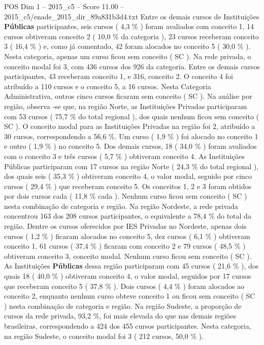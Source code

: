 \begin{textsample}{POS Dim 1 – 2015\_c5 – Score 11.00 – 2015\_c5/enade\_2015\_dir\_89a831b3d4.txt}
Entre os demais cursos de Instituições \textbf{Públicas} participantes, seis cursos ( 4,3 \% ) foram avaliados com conceito 1, 14 cursos obtiveram conceito 2 ( 10,0 \% da categoria ), 23 cursos receberam conceito 3 ( 16,4 \% ) e, como já comentado, 42 foram alocados no conceito 5 ( 30,0 \% ).
Nesta categoria, apenas um curso ficou sem conceito ( SC ).
Na rede privada, o conceito modal foi 3, com 436 cursos dos 926 da categoria.
Entre os demais cursos participantes, 43 receberam conceito 1, e 316, conceito 2.
O conceito 4 foi atribuído a 110 cursos e o conceito 5, a 16 cursos.
Nesta Categoria Administrativa, outros cinco cursos ficaram sem conceito ( SC ).
Na análise por região, observa -se que, na região Norte, as Instituições Privadas participaram com 53 cursos ( 75,7 \% do total regional ), dos quais nenhum ficou sem conceito ( SC ).
O conceito modal para as Instituições Privadas na região foi 2, atribuído a 30 cursos, correspondendo a 56,6 \%.
Um curso ( 1,9 \% ) foi alocado no conceito 1 e outro ( 1,9 \% ) no conceito 5.
Dos demais cursos, 18 ( 34,0 \% ) foram avaliados com o conceito 3 e três cursos ( 5,7 \% ) obtiveram conceito 4.
As Instituições Públicas participaram com 17 cursos na região Norte ( 24,3 \% do total regional ), dos quais seis ( 35,3 \% ) obtiveram conceito 4, o valor modal, seguido por cinco cursos ( 29,4 \% ) que receberam conceito 5.
Os conceitos 1, 2 e 3 foram obtidos por dois cursos cada ( 11,8 \% cada ).
Nenhum curso ficou sem conceito ( SC ) nesta combinação de categoria e região.
Na região Nordeste, a rede privada concentrou 163 dos 208 cursos participantes, o equivalente a 78,4 \% do total da região.
Dentre os cursos oferecidos por IES Privadas no Nordeste, apenas dois cursos ( 1,2 \% ) ficaram alocados no conceito 5, dez cursos ( 6,1 \% ) obtiveram conceito 1, 61 cursos ( 37,4 \% ) ficaram com conceito 2 e 79 cursos ( 48,5 \% ) obtiveram conceito 3, conceito modal.
Nenhum curso ficou sem conceito ( SC ).
As Instituições \textbf{Públicas} dessa região participaram com 45 cursos ( 21,6 \% ), dos quais 18 ( 40,0 \% ) obtiveram conceito 4, o valor modal, seguidos por 17 cursos que receberam conceito 5 ( 37,8 \% ).
Dois cursos ( 4,4 \% ) foram alocados ao conceito 2, enquanto nenhum curso obteve conceito 1 ou ficou sem conceito ( SC ) nesta combinação de categoria e região.
Na região Sudeste, a proporção de cursos da rede privada, 93,2 \%, foi mais elevada do que nas demais regiões brasileiras, correspondendo a 424 dos 455 cursos participantes.
Nesta categoria, na região Sudeste, o conceito modal foi 3 ( 212 cursos, 50,0 \% ).

\end{textsample}
